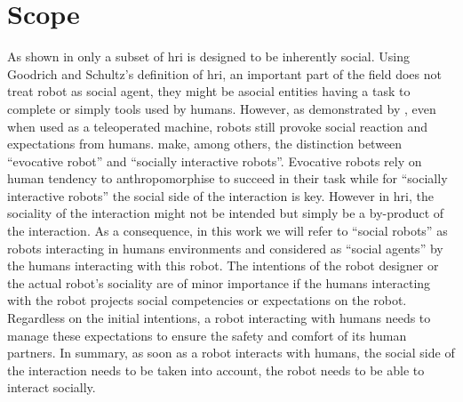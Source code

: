 \section{Scope}\label{sec:intro-scope}

As shown in \citep{goodrich2007human} only a subset of \gls{hri} is designed to be inherently social. Using Goodrich and Schultz's definition of \gls{hri}, an important part of the field does not treat robot as social agent, they might be asocial entities having a task to complete or simply tools used by humans. However, as demonstrated by \cite{fincannon2004evidence}, even when used as a teleoperated machine, robots still provoke social reaction and expectations from humans. \cite{fong2003survey} make, among others, the distinction between ``evocative robot'' and ``socially interactive robots''. Evocative robots rely on human tendency to anthropomorphise to succeed in their task while for ``socially interactive robots'' the social side of the interaction is key. However in \gls{hri}, the sociality of the interaction might not be intended but simply be a by-product of the interaction. As a consequence, in this work we will refer to ``social robots'' as robots interacting in humans environments and considered as ``social agents'' by the humans interacting with this robot. The intentions of the robot designer or the actual robot's sociality are of minor importance if the humans interacting with the robot projects social competencies or expectations on the robot. Regardless on the initial intentions, a robot interacting with humans needs to manage these expectations to ensure the safety and comfort of its human partners. In summary, as soon as a robot interacts with humans, the social side of the interaction needs to be taken into account, the robot needs to be able to interact socially. 


